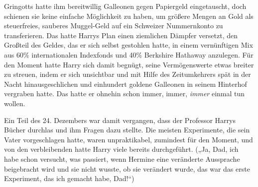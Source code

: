 Gringotts hatte ihm bereitwillig Galleonen gegen Papiergeld eingetauscht, doch schienen sie keine einfache Möglichkeit zu haben, um größere Mengen an Gold als steuerfreies, sauberes Muggel-Geld auf ein Schweizer Nummernkonto zu transferieren. Das hatte Harrys Plan einen ziemlichen Dämpfer versetzt, den Großteil des Geldes, das er sich selbst gestohlen hatte, in einem vernünftigen Mix aus 60\% internationalen Indexfonds und 40\% Berkshire Hathaway anzulegen.%
Für den Moment hatte Harry sich damit begnügt, seine Vermögenswerte etwas breiter zu streuen, indem er sich unsichtbar und mit Hilfe des Zeitumkehrers spät in der Nacht hinausgeschlichen und einhundert goldene Galleonen in seinem Hinterhof vergraben hatte. Das hatte er ohnehin schon immer, immer, \emph{immer} einmal tun wollen.

Ein Teil des 24. Dezembers war damit vergangen, dass der Professor Harrys Bücher durchlas und ihm Fragen dazu stellte. Die meisten Experimente, die sein Vater vorgeschlagen hatte, waren unpraktikabel, zumindest für den Moment, und von den verbleibenden hatte Harry viele bereits durchgeführt. („Ja, Dad, ich habe schon versucht, was passiert, wenn Hermine eine veränderte Aussprache beigebracht wird und sie nicht wusste, ob sie verändert wurde, das war das erste Experiment, das ich gemacht habe, Dad!“)

